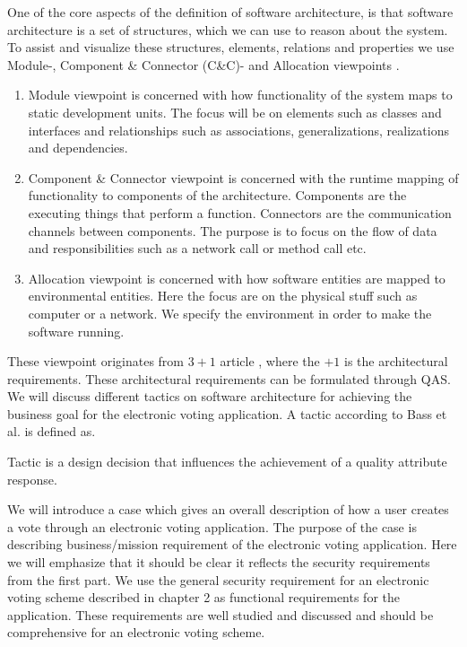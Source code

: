 \noindent
One of the core aspects of the definition of software architecture, is that software architecture is a set of structures, which we can use to reason about the system. To assist and visualize these structures, elements, relations and properties we use Module-, Component \& Connector (C\&C)- and Allocation viewpoints \cite{3+1}. 

\begin{enumerate}
    \item Module viewpoint is concerned with how functionality of the system maps to static development units. The focus will be on elements such as classes and interfaces and relationships such as associations, generalizations, realizations and dependencies.
    \item Component \& Connector viewpoint is concerned with the runtime mapping of functionality to components of the architecture. Components are the executing things that perform a function. Connectors are the communication channels between components. The purpose is to focus on the flow of data and responsibilities such as a network call or method call etc.
    \item Allocation viewpoint is concerned with how software entities are mapped to environmental entities. Here the focus are on the physical stuff such as computer or a network. We specify the environment in order to make the software running. 
\end{enumerate}

\noindent
These viewpoint originates from $3+1$ article \cite{3+1}, where the $+1$ is the architectural requirements. These architectural requirements can be formulated through QAS.\\

\noindent
We will discuss different tactics on software architecture for achieving the business goal for the electronic voting application. A tactic according to Bass et al. is defined as.

\begin{defi}
Tactic is a design decision that influences the achievement of a quality attribute response. \cite{Bass}
\end{defi}

\noindent
We will introduce a case which gives an overall description of how a user creates a vote through an electronic voting application. The purpose of the case is describing business/mission requirement of the electronic voting application. Here we will emphasize that it should be clear it reflects the security requirements from the first part. We use the general security requirement for an electronic voting scheme described in chapter 2 as functional requirements for the application. These requirements are well studied and discussed and should be comprehensive for an electronic voting scheme.